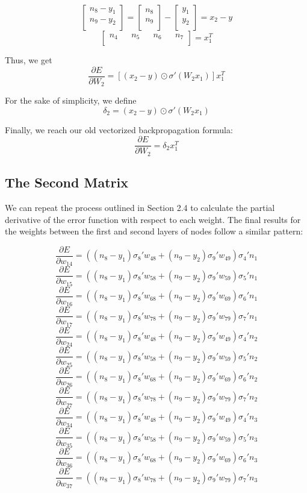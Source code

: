 \documentclass{article}
\begin{document}
\[
\begin{bmatrix}
    n_8-y_1 \\
    n_9-y_2 \\
\end{bmatrix}
=
\begin{bmatrix}
    n_8 \\
    n_9 \\
\end{bmatrix}
-
\begin{bmatrix}
    y_1 \\
    y_2 \\
\end{bmatrix}
=
x_2-y
\]
\[
\begin{bmatrix}
    n_4 && n_5 && n_6 && n_7 \\
\end{bmatrix}
=
x_1^T
\]

Thus, we get
\[\dfrac{\partial E}{\partial W_2} = [(x_2 - y) \odot \sigma'(W_2x_1)]x_1^T\]

For the sake of simplicity, we define
\[\delta_2 = (x_2 - y) \odot \sigma'(W_2x_1)\]

Finally, we reach our old vectorized backpropagation formula:
\[\dfrac{\partial E}{\partial W_2} = \delta_2x_1^T\]

\subsection{The Second Matrix}
We can repeat the process outlined in Section 2.4 to calculate the partial derivative of the error function with respect to each weight. The final results for the weights between the first and second layers of nodes follow a similar pattern:

\[\dfrac{\partial E}{\partial w_{14}} =  \left((n_8-y_1)\sigma_8'w_{48} + (n_9-y_2)\sigma_9'w_{49}\right)\sigma_4'n_1\]
\[\dfrac{\partial E}{\partial w_{15}} =  \left((n_8-y_1)\sigma_8'w_{58} + (n_9-y_2)\sigma_9'w_{59}\right)\sigma_5'n_1\]
\[\dfrac{\partial E}{\partial w_{16}} =  \left((n_8-y_1)\sigma_8'w_{68} + (n_9-y_2)\sigma_9'w_{69}\right)\sigma_6'n_1\]
\[\dfrac{\partial E}{\partial w_{17}} =  \left((n_8-y_1)\sigma_8'w_{78} + (n_9-y_2)\sigma_9'w_{79}\right)\sigma_7'n_1\]
\[\dfrac{\partial E}{\partial w_{24}} =  \left((n_8-y_1)\sigma_8'w_{48} + (n_9-y_2)\sigma_9'w_{49}\right)\sigma_4'n_2\]
\[\dfrac{\partial E}{\partial w_{25}} =  \left((n_8-y_1)\sigma_8'w_{58} + (n_9-y_2)\sigma_9'w_{59}\right)\sigma_5'n_2\]
\[\dfrac{\partial E}{\partial w_{26}} =  \left((n_8-y_1)\sigma_8'w_{68} + (n_9-y_2)\sigma_9'w_{69}\right)\sigma_6'n_2\]
\[\dfrac{\partial E}{\partial w_{27}} =  \left((n_8-y_1)\sigma_8'w_{78} + (n_9-y_2)\sigma_9'w_{79}\right)\sigma_7'n_2\]
\[\dfrac{\partial E}{\partial w_{34}} =  \left((n_8-y_1)\sigma_8'w_{48} + (n_9-y_2)\sigma_9'w_{49}\right)\sigma_4'n_3\]
\[\dfrac{\partial E}{\partial w_{35}} =  \left((n_8-y_1)\sigma_8'w_{58} + (n_9-y_2)\sigma_9'w_{59}\right)\sigma_5'n_3\]
\[\dfrac{\partial E}{\partial w_{36}} =  \left((n_8-y_1)\sigma_8'w_{68} + (n_9-y_2)\sigma_9'w_{69}\right)\sigma_6'n_3\]
\[\dfrac{\partial E}{\partial w_{37}} =  \left((n_8-y_1)\sigma_8'w_{78} + (n_9-y_2)\sigma_9'w_{79}\right)\sigma_7'n_3\]
\end{document}
